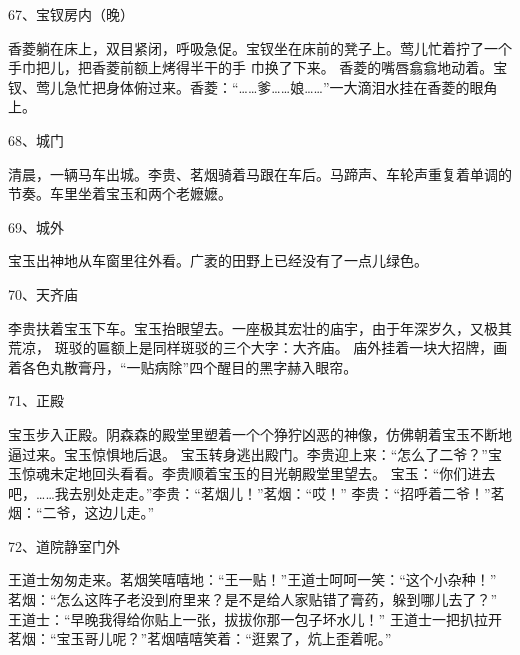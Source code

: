 67、宝钗房内（晚）\par
香菱躺在床上，双目紧闭，呼吸急促。宝钗坐在床前的凳子上。莺儿忙着拧了一个手巾把儿，把香菱前额上烤得半干的手
巾换了下来。
香菱的嘴唇翕翕地动着。宝钗、莺儿急忙把身体俯过来。香菱：“……爹……娘……”一大滴泪水挂在香菱的眼角上。

68、城门\par
清晨，一辆马车出城。李贵、茗烟骑着马跟在车后。马蹄声、车轮声重复着单调的节奏。车里坐着宝玉和两个老嬷嬷。

69、城外\par
宝玉出神地从车窗里往外看。广袤的田野上已经没有了一点儿绿色。

70、天齐庙\par
李贵扶着宝玉下车。宝玉抬眼望去。一座极其宏壮的庙宇，由于年深岁久，又极其荒凉，
斑驳的匾额上是同样斑驳的三个大字：大齐庙。
庙外挂着一块大招牌，画着各色丸散膏丹，“一贴病除”四个醒目的黑字赫入眼帘。

71、正殿\par
宝玉步入正殿。阴森森的殿堂里塑着一个个狰狞凶恶的神像，仿佛朝着宝玉不断地逼过来。宝玉惊惧地后退。
宝玉转身逃出殿门。李贵迎上来：“怎么了二爷？”宝玉惊魂未定地回头看看。李贵顺着宝玉的目光朝殿堂里望去。
宝玉：“你们进去吧，……我去别处走走。”李贵：“茗烟儿！”茗烟：“哎！”
李贵：“招呼着二爷！”茗烟：“二爷，这边儿走。”

72、道院静室门外\par
王道士匆匆走来。茗烟笑嘻嘻地：“王一贴！”王道士呵呵一笑：“这个小杂种！”
茗烟：“怎么这阵子老没到府里来？是不是给人家贴错了膏药，躲到哪儿去了？”
王道士：“早晚我得给你贴上一张，拔拔你那一包子坏水儿！”
王道士一把扒拉开茗烟：“宝玉哥儿呢？”茗烟嘻嘻笑着：“逛累了，炕上歪着呢。”

